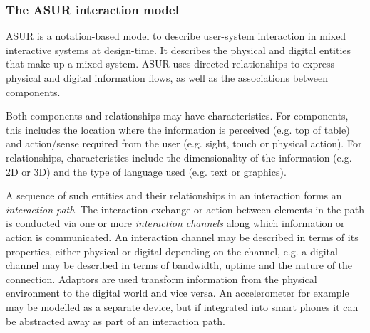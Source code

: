 % 
% 







\subsubsection{The ASUR interaction model}
\label{theasurinteractionmodel}

\ac{ASUR} is a notation-based model to describe user-system interaction in mixed interactive systems \cite{Dubois2008} at design-time. It describes the physical and digital entities that make up a mixed system. \ac{ASUR} uses directed relationships to express physical and digital information flows, as well as the associations between components.

Both components and relationships may have characteristics. For components, this includes the location where the information is perceived (e.g. top of table) and action/sense required from the user (e.g. sight, touch or physical action). For relationships, characteristics include the dimensionality of the information (e.g. 2D or 3D) and the type of language used (e.g. text or graphics).

A sequence of such entities and their relationships in an interaction forms an \emph{interaction path}. The interaction exchange or action between elements in the path is conducted via one or more \emph{interaction channels} along which information or action is communicated. An interaction channel may be described in terms of its properties, either physical or digital depending on the channel, e.g. a digital channel may be described in terms of bandwidth, uptime and the nature of the connection. Adaptors are used transform information from the physical environment to the digital world and vice versa. An accelerometer for example may be modelled as a separate device, but if integrated into smart phones it can be abstracted away as part of an interaction path. 

